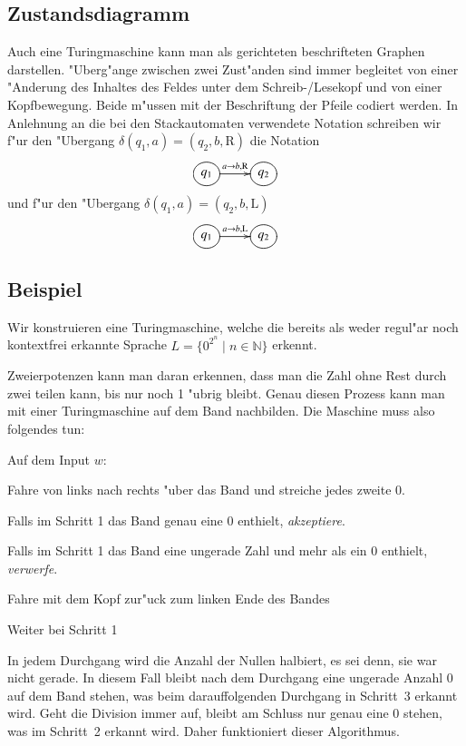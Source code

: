 \subsection{Zustandsdiagramm}
Auch eine Turingmaschine kann man als gerichteten beschrifteten Graphen
darstellen. "Uberg"ange zwischen zwei Zust"anden sind immer begleitet von
einer "Anderung des Inhaltes des Feldes unter dem Schreib-/Lesekopf
und von einer Kopfbewegung. Beide m"ussen mit der Beschriftung
der Pfeile codiert werden. In Anlehnung an die bei den Stackautomaten
verwendete Notation schreiben wir f"ur den "Ubergang
$\delta(q_1,a)=(q_2,b,\text{R})$
die Notation
\[
\entrymodifiers={++[o][F]}
\xymatrix{
{q_1}\ar[r]^{a\to b,\text{R}}
	&{q_2}
}
\]
und f"ur den "Ubergang
$\delta(q_1,a)=(q_2,b,\text{L})$
\[
\entrymodifiers={++[o][F]}
\xymatrix{
{q_1}\ar[r]^{a\to b,\text{L}}
	&{q_2}
}
\]

\subsection{Beispiel}
Wir konstruieren eine Turingmaschine, welche die bereits als weder regul"ar
noch kontextfrei erkannte Sprache $L=\{0^{2^n}\;|\; n\in\mathbb N\}$
erkennt.

Zweierpotenzen kann man daran erkennen, dass man die Zahl ohne
Rest durch zwei teilen kann, bis nur noch 1 "ubrig bleibt. Genau
diesen Prozess kann man mit einer Turingmaschine auf dem Band
nachbilden. Die Maschine muss also folgendes tun:

Auf dem Input $w$:
\begin{compactenum}
\item Fahre von links nach rechts "uber das Band und streiche jedes zweite $0$.
\item Falls im Schritt 1 das Band genau eine $0$ enthielt, {\it akzeptiere}.
\item Falls im Schritt 1 das Band eine ungerade Zahl und mehr als ein $0$
enthielt, {\it verwerfe}.
\item Fahre mit dem Kopf zur"uck zum linken Ende des Bandes
\item Weiter bei Schritt 1
\end{compactenum}
In jedem Durchgang wird die Anzahl der Nullen halbiert, es sei denn,
sie war nicht gerade. In diesem Fall bleibt nach dem Durchgang eine
ungerade Anzahl $0$ auf dem Band stehen, was beim darauffolgenden Durchgang
in Schritt~3 erkannt wird. Geht die Division immer auf, bleibt am Schluss
nur genau eine $0$ stehen, was im Schritt~2 erkannt wird. Daher funktioniert
dieser Algorithmus.

